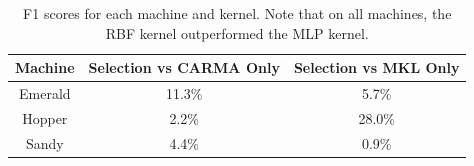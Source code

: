 \begin{table}[t]
    \begin{center}
        \begin{tabular}{c|c|c}
            Machine & Selection vs CARMA Only & Selection vs MKL Only \\ \hline
            Emerald & 11.3\% & 5.7\% \\
            Hopper & 2.2\% & 28.0\% \\
            Sandy & 4.4\% & 0.9\% \\
        \end{tabular}
    \end{center}
    \caption{F1 scores for each machine and kernel. Note that on all machines, the RBF kernel outperformed the MLP kernel.}
    \label{t:improvements}
\end{table}
